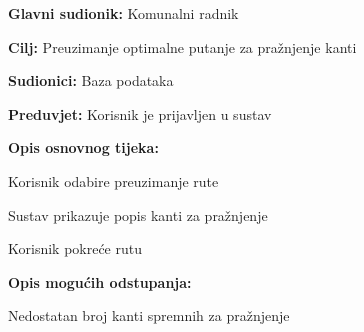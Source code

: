 	\noindent {}
					\begin{packed_item}
	
						\item \textbf{Glavni sudionik: } Komunalni radnik
						\item  \textbf{Cilj:} Preuzimanje optimalne putanje za pražnjenje kanti
						\item  \textbf{Sudionici:} Baza podataka
						\item  \textbf{Preduvjet:} Korisnik je prijavljen u sustav
						\item  \textbf{Opis osnovnog tijeka:}
						
						\item[] \begin{packed_enum}
	
							\item Korisnik odabire preuzimanje rute
							\item Sustav prikazuje popis kanti za pražnjenje
							\item Korisnik pokreće rutu
						\end{packed_enum}
						
						\item  \textbf{Opis mogućih odstupanja:}
						
						\item[] \begin{packed_item}
	
							\item[1.a] Nedostatan broj kanti spremnih za pražnjenje 
							
							\item[] \begin{packed_enum}
								
								\item 
								
							\end{packed_enum}
														
						\end{packed_item}
					\end{packed_item}





